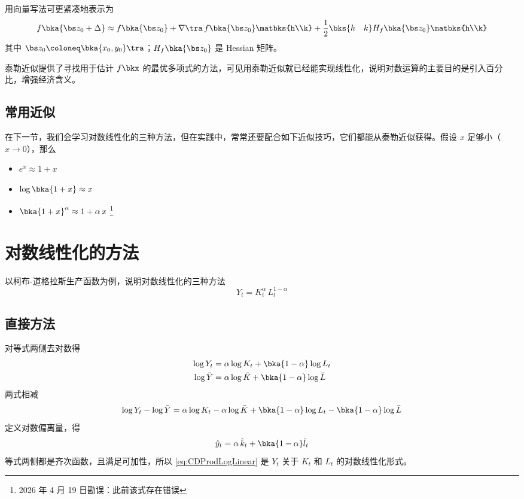 用向量写法可更紧凑地表示为
\begin{equation}
    f\bka{\bs z_0+\Delta}\approx f\bka{\bs z_0}+\nabla\tra \, f\bka{\bs z_0}\matbks{h\\k}+\frac12\bks{h\quad k} H_f\bka{\bs z_0}\matbks{h\\k}
\end{equation}
其中 \(\bs z_0\coloneq\bka{x_0,y_0}\tra\)；\(H_f\bka{\bs z_0}\) 是 Hessian 矩阵。

泰勒近似提供了寻找用于估计 \(f\bkx\) 的最优多项式的方法，可见用泰勒近似就已经能实现线性化，说明对数运算的主要目的是引入百分比，增强经济含义。

\subsection{常用近似}\label{subsec:CommonApprox}

在下一节，我们会学习对数线性化的三种方法，但在实践中，常常还要配合如下近似技巧，它们都能从泰勒近似获得。假设 \(x\) 足够小（\(x\to0\)），那么
\begin{itemize}
    \item \(e^x\approx 1+x\)
    \item \(\log\bka{1+x}\approx x\)
    \item \(\bka{1+x}^\alpha\approx 1+ \alpha\,x\) \footnote{2026 年 4 月 19 日勘误：此前该式存在错误}
\end{itemize}

\section{对数线性化的方法}\label{sec:LogLineMethod}

以柯布-道格拉斯生产函数为例，说明对数线性化的三种方法
\begin{equation}
    Y_t=K_t^\alpha\,L_t^{1-\alpha}\label{eq:CDProdExample}
\end{equation}

\subsection{直接方法}\label{subsec:LogLineBasic}

对等式两侧去对数得
\begin{align}
    \log Y_t & = \alpha\log K_t + \bka{1-\alpha}\log L_t\notag\\ 
    \log \bar Y & = \alpha\log \bar K + \bka{1-\alpha}\log \bar L\label{eq:CDProdLog}
\end{align}
两式相减
\begin{equation}
    \log Y_t - \log \bar Y = \alpha\log K_t - \alpha\log \bar K + \bka{1-\alpha}\log L_t - \bka{1-\alpha}\log \bar L
\end{equation}
定义对数偏离量，得
\begin{equation}
    \hat y_t = \alpha\,\hat k_t + \bka{1-\alpha}\hat l_t\label{eq:CDProdLogLinear}
\end{equation}
等式两侧都是齐次函数，且满足可加性，所以 \ref{eq:CDProdLogLinear} 是 \(Y_t\) 关于 \(K_t\) 和 \(L_t\) 的对数线性化形式。

